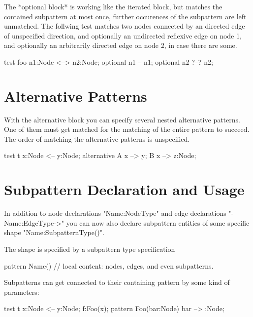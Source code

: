 The *optional block* is working like the iterated block,
but matches the contained subpattern at most once, 
further occurences of the subpattern are left unmatched.
The follwing test matches two nodes connected by an directed edge
of unspecified direction, and optionally an undirected reflexive edge
on node 1, and optionally an arbitrarily directed edge on node 2,
in case there are some.

\begin{example}
  \begin{grgen}
test foo {
  n1:Node <--> n2:Node;
  optional {
    n1 -- n1;
  }
  optional {
    n2 ?--? n2;
  }
}
  \end{grgen}
\end{example}


\section{Alternative Patterns}
\label{alternative}

With the alternative block you can specify several nested alternative
patterns. One of them must get matched for the matching of the entire pattern
to succeed. The order of matching the alternative patterns is unspecified.

\begin{example}
  \begin{grgen}
test t {
  x:Node <-- y:Node;
  alternative {
    A {
      x --> y;
    }
    B {
      x --> z:Node;
    }
  }
}
  \end{grgen}
\end{example}


\section{Subpattern Declaration and Usage}
\label{subpattern}

In addition to node declarations "Name:NodeType" and edge declarations
"-Name:EdgeType->" you can now also declare subpattern entities of some
specific shape "Name:SubpatternType()".

The shape is specified by a subpattern type specification

pattern Name() {
  // local content: nodes, edges, and even subpatterns.
}

Subpatterns can get connected to their containing pattern 
by some kind of parameters:

\begin{example}
  \begin{grgen}
test t {
  x:Node <-- y:Node;
  f:Foo(x);
}
pattern Foo(bar:Node) {
  bar --> :Node;
}
  \end{grgen}
\end{example}

